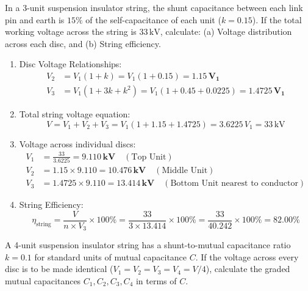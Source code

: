 \documentclass[11pt,a4paper]{article}
\newenvironment{Problem}[1][Numerical Problem]{\begin{tcolorbox}[problembox, title=#1]}{\end{tcolorbox}}
\newenvironment{Solution}[1][Step-by-Step Solution]{\begin{tcolorbox}[solbox, title=#1]}{\end{tcolorbox}}
\begin{document}
\begin{Problem}[Problem 6: String Efficiency of a 3-Disc Suspension Insulator String]
In a 3-unit suspension insulator string, the shunt capacitance between each link pin and earth is $15\%$ of the self-capacitance of each unit ($k = 0.15$). If the total working voltage across the string is $33\,\text{kV}$, calculate: (a) Voltage distribution across each disc, and (b) String efficiency.
\end{Problem}

\begin{Solution}
\begin{enumerate}
  \item Disc Voltage Relationships:
    \begin{align*}
      V_2 &= V_1 (1 + k) = V_1 (1 + 0.15) = \mathbf{1.15\,V_1} \\
      V_3 &= V_1 (1 + 3k + k^2) = V_1 (1 + 0.45 + 0.0225) = \mathbf{1.4725\,V_1}
    \end{align*}
  \item Total string voltage equation:
    \begin{equation*}
      V = V_1 + V_2 + V_3 = V_1 (1 + 1.15 + 1.4725) = 3.6225\,V_1 = 33\,\text{kV}
    \end{equation*}
  \item Voltage across individual discs:
    \begin{align*}
      V_1 &= \frac{33}{3.6225} = \mathbf{9.110\,\text{kV}} \quad (\text{Top Unit}) \\
      V_2 &= 1.15 \times 9.110 = \mathbf{10.476\,\text{kV}} \quad (\text{Middle Unit}) \\
      V_3 &= 1.4725 \times 9.110 = \mathbf{13.414\,\text{kV}} \quad (\text{Bottom Unit nearest to conductor})
    \end{align*}
  \item String Efficiency:
    \begin{equation*}
      \eta_{\text{string}} = \frac{V}{n \times V_3} \times 100\% = \frac{33}{3 \times 13.414} \times 100\% = \frac{33}{40.242} \times 100\% = \mathbf{82.00\%}
    \end{equation*}
\end{enumerate}
\end{Solution}

\begin{Problem}[Problem 7: Capacitance Grading for 100\% String Efficiency]
A 4-unit suspension insulator string has a shunt-to-mutual capacitance ratio $k = 0.1$ for standard units of mutual capacitance $C$. If the voltage across every disc is to be made identical ($V_1 = V_2 = V_3 = V_4 = V/4$), calculate the graded mutual capacitances $C_1, C_2, C_3, C_4$ in terms of $C$.
\end{Problem}
\end{document}
